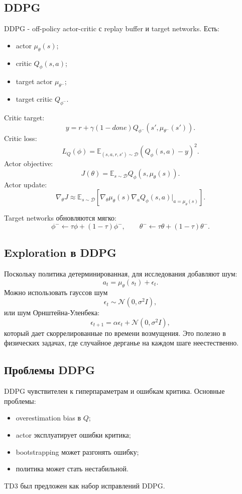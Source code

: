 \documentclass[11pt,a4paper]{article}
\newcommand{\E}{\mathbb{E}}
\newcommand{\1}{\mathbf{1}}
\newcommand{\cD}{\mathcal D}
\begin{document}
\subsection*{DDPG}
DDPG - off-policy actor-critic с replay buffer и target networks. Есть:
\begin{itemize}
    \item actor $\mu_\theta(s)$;
    \item critic $Q_\phi(s,a)$;
    \item target actor $\mu_{\theta^-}$;
    \item target critic $Q_{\phi^-}$.
\end{itemize}

Critic target:
\[
    y=r+\gamma(1-done)Q_{\phi^-}(s',\mu_{\theta^-}(s')).
\]
Critic loss:
\[
    L_Q(\phi)=\E_{(s,a,r,s')\sim\cD}\left(Q_\phi(s,a)-y\right)^2.
\]
Actor objective:
\[
    J(\theta)=\E_{s\sim\cD}Q_\phi(s,
    \mu_\theta(s)).
\]
Actor update:
\[
    \nabla_\theta J\approx \E_{s\sim\cD}\left[
    \nabla_\theta\mu_\theta(s)\nabla_a Q_\phi(s,a)\big|_{a=\mu_\theta(s)}
    \right].
\]

Target networks обновляются мягко:
\[
    \phi^-\leftarrow \tau\phi+(1-\tau)\phi^-,
    \qquad
    \theta^-\leftarrow \tau\theta+(1-\tau)\theta^-.
\]

\subsection*{Exploration в DDPG}
Поскольку политика детерминированная, для исследования добавляют шум:
\[
    a_t=\mu_\theta(s_t)+\epsilon_t.
\]
Можно использовать гауссов шум
\[
    \epsilon_t\sim\mathcal N(0,\sigma^2I),
\]
или шум Орнштейна-Уленбека:
\[
    \epsilon_{t+1}=\alpha\epsilon_t+\mathcal N(0,\sigma^2I),
\]
который дает скоррелированные по времени возмущения. Это полезно в физических задачах, где случайное дерганье на каждом шаге неестественно.

\subsection*{Проблемы DDPG}
DDPG чувствителен к гиперпараметрам и ошибкам критика. Основные проблемы:
\begin{itemize}
    \item overestimation bias в $Q$;
    \item actor эксплуатирует ошибки критика;
    \item bootstrapping может разгонять ошибку;
    \item политика может стать нестабильной.
\end{itemize}
TD3 был предложен как набор исправлений DDPG.
\end{document}
